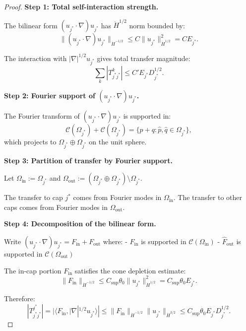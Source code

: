 \documentclass[11pt]{article}
\theoremstyle{definition}
\begin{document}
\begin{proof}
\textbf{Step 1: Total self-interaction strength.}

The bilinear form $(u_{j^*} \cdot \nabla)u_{j^*}$ has $\dot{H}^{1/2}$ norm bounded by:
\begin{equation}
\|(u_{j^*} \cdot \nabla)u_{j^*}\|_{\dot{H}^{-1/2}} \leq C \|u_{j^*}\|_{\dot{H}^{1/2}}^2 = C E_{j^*}.
\end{equation}

The interaction with $|\nabla|^{1/2} u_{j^*}$ gives total transfer magnitude:
\begin{equation}
\sum_k |T_{j^* j^*}^k| \leq C' E_{j^*} D_{j^*}^{1/2}.
\end{equation}

\textbf{Step 2: Fourier support of $(u_{j^*} \cdot \nabla)u_{j^*}$.}

The Fourier transform of $(u_{j^*} \cdot \nabla)u_{j^*}$ is supported in:
\begin{equation}
\mathcal{C}(\Omega_{j^*}) + \mathcal{C}(\Omega_{j^*}) = \{p + q : \hat{p}, \hat{q} \in \Omega_{j^*}\},
\end{equation}
which projects to $\Omega_{j^*} \oplus \Omega_{j^*}$ on the unit sphere.

\textbf{Step 3: Partition of transfer by Fourier support.}

Let $\Omega_{\text{in}} := \Omega_{j^*}$ and $\Omega_{\text{out}} := (\Omega_{j^*} \oplus \Omega_{j^*}) \setminus \Omega_{j^*}$.

The transfer to cap $j^*$ comes from Fourier modes in $\Omega_{\text{in}}$.
The transfer to other caps comes from Fourier modes in $\Omega_{\text{out}}$.

\textbf{Step 4: Decomposition of the bilinear form.}

Write $(u_{j^*} \cdot \nabla)u_{j^*} = F_{\text{in}} + F_{\text{out}}$ where:
- $\hat{F}_{\text{in}}$ is supported in $\mathcal{C}(\Omega_{\text{in}})$
- $\hat{F}_{\text{out}}$ is supported in $\mathcal{C}(\Omega_{\text{out}})$

The in-cap portion $F_{\text{in}}$ satisfies the cone depletion estimate:
\begin{equation}
\|F_{\text{in}}\|_{\dot{H}^{-1/2}} \leq C_{\text{sup}} \theta_0 \|u_{j^*}\|_{\dot{H}^{1/2}}^2 = C_{\text{sup}} \theta_0 E_{j^*}.
\end{equation}

Therefore:
\begin{equation}
|T_{j^* j^*}^{j^*}| = |\langle F_{\text{in}}, |\nabla|^{1/2} u_{j^*}\rangle| \leq \|F_{\text{in}}\|_{\dot{H}^{-1/2}} \|u_{j^*}\|_{\dot{H}^{3/2}} \leq C_{\text{sup}} \theta_0 E_{j^*} D_{j^*}^{1/2}.
\end{equation}


\end{proof}
\end{document}
